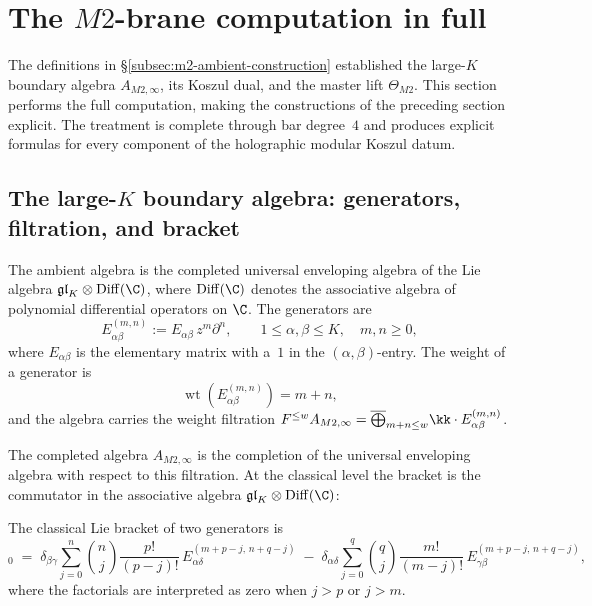 
\section{The \texorpdfstring{$M2$}{M2}-brane computation in full}

The definitions in \S\ref{subsec:m2-ambient-construction} established the
large-$K$ boundary algebra $A_{M2,\infty}$, its Koszul dual, and the
master lift $\Theta_{M2}$. This section performs the full
computation, making the constructions of the preceding section explicit. The treatment is complete through bar degree~$4$ and
produces explicit formulas for every component of the holographic
modular Koszul datum.

\subsection{The large-\texorpdfstring{$K$}{K} boundary algebra:
generators, filtration, and bracket}

The ambient algebra is the completed universal
enveloping algebra of the Lie algebra
$\mathfrak{gl}_K \otimes \Diff(\C)$, where $\Diff(\C)$ denotes the
associative algebra of polynomial differential operators on $\C$.
The generators are
\begin{equation}%
E^{(m,n)}_{\alpha\beta}
:= E_{\alpha\beta}\,z^m\partial^n,
\qquad
1\le \alpha,\beta\le K,\quad m,n\ge 0,
\end{equation}
where $E_{\alpha\beta}$ is the elementary matrix with a~$1$ in the
$(\alpha,\beta)$-entry. The weight of a generator is
\begin{equation}%
\operatorname{wt}(E^{(m,n)}_{\alpha\beta}) = m + n,
\end{equation}
and the algebra carries the weight filtration
$F^{\le w} A_{M2,\infty}
= \overline{\bigoplus}_{m+n \le w} \kk\cdot E^{(m,n)}_{\alpha\beta}$.

The completed algebra $A_{M2,\infty}$ is the completion of the universal
enveloping algebra with respect to this filtration. At the
classical level the bracket is the commutator in the associative
algebra $\mathfrak{gl}_K \otimes \Diff(\C)$:

\begin{proposition}
The classical Lie bracket of two generators is
\begin{equation}%
[E^{(m,n)}_{\alpha\beta},\, E^{(p,q)}_{\gamma\delta}]_0
\;=\;
\delta_{\beta\gamma}
\sum_{j=0}^{n}\binom{n}{j}
\frac{p!}{(p-j)!}\,
E^{(m+p-j,\,n+q-j)}_{\alpha\delta}
\;-\;
\delta_{\alpha\delta}
\sum_{j=0}^{q}\binom{q}{j}
\frac{m!}{(m-j)!}\,
E^{(m+p-j,\,n+q-j)}_{\gamma\beta},
\end{equation}
where the factorials are interpreted as zero when $j>p$ or $j>m$.
\end{proposition}

